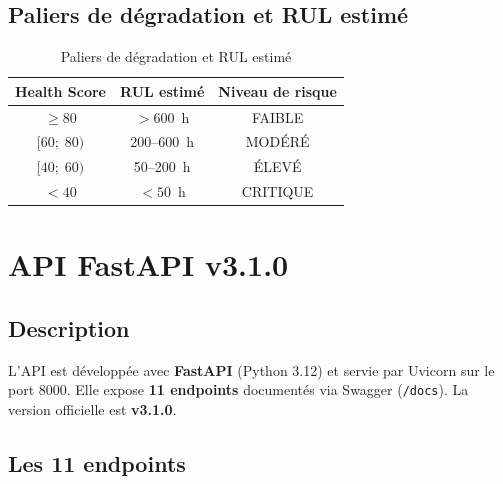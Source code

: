 \documentclass[12pt,a4paper]{report}
\begin{document}
\subsection{Paliers de dégradation et RUL estimé}

\begin{table}[h]
\centering
\caption{Paliers de dégradation et RUL estimé}
\begin{tabular}{ccc}
\toprule
\textbf{Health Score} & \textbf{RUL estimé} & \textbf{Niveau de risque} \\
\midrule
$\geq 80$        & $> 600$~h    & FAIBLE   \\
$[60;\; 80)$     & 200--600~h   & MODÉRÉ   \\
$[40;\; 60)$     & 50--200~h    & ÉLEVÉ    \\
$< 40$           & $< 50$~h     & CRITIQUE \\
\bottomrule
\end{tabular}
\end{table}

\section{API FastAPI v3.1.0}

\subsection{Description}

L'API est développée avec \textbf{FastAPI} (Python 3.12) et servie par Uvicorn sur le
port 8000. Elle expose \textbf{11 endpoints} documentés via Swagger (\texttt{/docs}).
La version officielle est \textbf{v3.1.0}.

\subsection{Les 11 endpoints}
\end{document}
